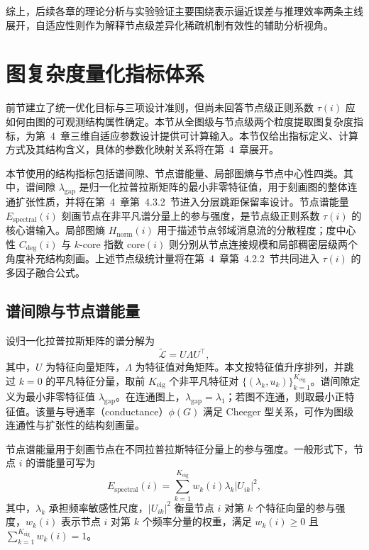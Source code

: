综上，后续各章的理论分析与实验验证主要围绕表示逼近误差与推理效率两条主线展开，自适应性则作为解释节点级差异化稀疏机制有效性的辅助分析视角。

\section{图复杂度量化指标体系}
\label{sec:ch3-complexity}

前节建立了统一优化目标与三项设计准则，但尚未回答节点级正则系数 $\tau(i)$ 应如何由图的可观测结构属性确定。本节从全图级与节点级两个粒度提取图复杂度指标，为第~4~章三维自适应参数设计提供可计算输入。本节仅给出指标定义、计算方式及其结构含义，具体的参数化映射关系将在第~4~章展开。
\label{subsec:ch3-indices}

本节使用的结构指标包括谱间隙、节点谱能量、局部图熵与节点中心性四类。其中，谱间隙 $\lambda_{\text{gap}}$ 是归一化拉普拉斯矩阵的最小非零特征值，用于刻画图的整体连通扩张性质，并将在第~4~章第~4.3.2~节进入分层跳距保留率设计。节点谱能量 $E_{\text{spectral}}(i)$ 刻画节点在非平凡谱分量上的参与强度，是节点级正则系数 $\tau(i)$ 的核心谱输入。局部图熵 $H_{\text{norm}}(i)$ 用于描述节点邻域消息流的分散程度；度中心性 $C_{\text{deg}}(i)$ 与 $k$-core 指数 $\mathrm{core}(i)$ 则分别从节点连接规模和局部稠密层级两个角度补充结构刻画。上述节点级统计量将在第~4~章第~4.2.2~节共同进入 $\tau(i)$ 的多因子融合公式。

\subsection{谱间隙与节点谱能量}
\label{subsec:ch3-specenergy}
\label{def:ch3-specenergy}

设归一化拉普拉斯矩阵的谱分解为
\begin{equation}
  \tilde{\mathcal{L}}=U\Lambda U^\top,
  \label{eq:ch3-laplacian-eigendecomposition}
\end{equation}
其中，$U$ 为特征向量矩阵，$\Lambda$ 为特征值对角矩阵。本文按特征值升序排列，并跳过 $k=0$ 的平凡特征分量，取前 $K_{\text{eig}}$ 个非平凡特征对 $\{(\lambda_k,u_k)\}_{k=1}^{K_{\text{eig}}}$。谱间隙定义为最小非零特征值 $\lambda_{\text{gap}}$。在连通图上，$\lambda_{\text{gap}}=\lambda_1$；若图不连通，则取最小正特征值。该量与导通率（conductance）$\phi(G)$ 满足 Cheeger 型关系\cite{AlonMilman1985,Chung1997}，可作为图级连通性与扩张性的结构刻画量。

节点谱能量用于刻画节点在不同拉普拉斯特征分量上的参与强度。一般形式下，节点 $i$ 的谱能量可写为
\begin{equation}
  E_{\text{spectral}}(i)
  =
  \sum_{k=1}^{K_{\text{eig}}}
  w_k(i)\lambda_k |U_{ik}|^2,
  \label{eq:ch3-specenergy-general}
\end{equation}
其中，$\lambda_k$ 承担频率敏感性尺度，$|U_{ik}|^2$ 衡量节点 $i$ 对第 $k$ 个特征向量的参与强度，$w_k(i)$ 表示节点 $i$ 对第 $k$ 个频率分量的权重，满足 $w_k(i)\geq 0$ 且 $\sum_{k=1}^{K_{\text{eig}}}w_k(i)=1$。


